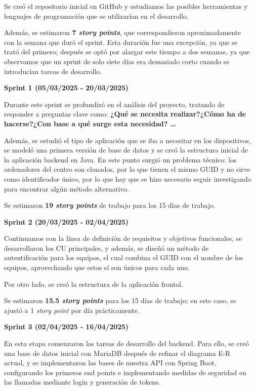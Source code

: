 Se creó el repositorio inicial en GitHub y estudiamos las posibles herramientas y lenguajes de programación que se utilizarían
en el desarrollo.

Además, se estimaron  \textbf{7 \textit{story points}}, que correspondieron aproximadamente con la semana que duró el sprint.
Esta duración fue una excepción, ya que se trató del primero; después se optó por alargar este tiempo a dos
semanas, ya que observamos que un sprint de solo siete días era demasiado corto cuando se introducían tareas de desarrollo.

\textbf{Sprint 1 (05/03/2025 - 20/03/2025)}

Durante este sprint se profundizó en el análisis del proyecto, tratando de responder a preguntas clave como:
\textbf{¿Qué se necesita realizar?¿Cómo ha de hacerse?¿Con base a qué surge esta necesidad? \ldots}

Además, se estudió el tipo de aplicación que se iba a necesitar en los dispositivos, se modeló una primera versión de
base de datos y se creó la estructura inicial de la aplicación backend en Java.
En este punto surgió un problema técnico: los ordenadores del centro son clonados, por lo que tienen el mismo GUID y no sirve como
identificador único, por lo que hay que se hizo necesario seguir investigando para encontrar algún método alternativo.

Se estimaron \textbf{19 \textit{story points}} de trabajo para los 15 días de trabajo.


\textbf{Sprint 2 (20/03/2025 - 02/04/2025)}

Continuamos con la línea de definición de requisitos y objetivos funcionales, se desarrollaron los CU principales, y además, se
diseñó un método de autentificación para los equipos, el cual combina el GUID con el nombre de los equipos, aprovechando
que estos sí son únicos para cada uno.

Por otro lado, se creó la estructura de la aplicación frontal.

Se estimaron \textbf{15.5 \textit{story points}} para los 15 días de trabajo; en este caso, se ajustó a 1 \textit{story point} por día prácticamente.


\textbf{Sprint 3 (02/04/2025 - 16/04/2025)}

En esta etapa comenzaron las tareas de desarrollo del backend.
Para ello, se creó una base de datos inicial con MariaDB después de refinar el diagrama E-R actual, y se implementaron
las bases de nuestra API con Spring Boot, configurando los primeros end points e implementando medidas de seguridad
en las llamadas mediante login y generación de tokens.

